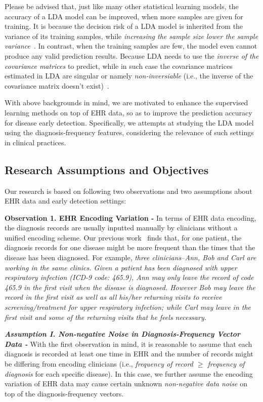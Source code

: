 \documentclass[journal,compsoc]{IEEEtran}
\begin{document}
Please be advised that, just like many other statistical learning models, the accuracy of a LDA model can be improved, when more samples are given for training.
It is because the decision risk of a LDA model is inherited from the variance of its training samples, while \emph{increasing the sample size lower the sample variance}~\cite{hsu1947complete,qiao2008effective}.
In contrast, when the training samples are few, the model even cannot produce any valid prediction results.
Because LDA needs to use the \emph{inverse of the covariance matrices} to predict, while in such case the covariance matrices estimated in LDA are singular or namely \emph{non-inversiable} (i.e., the inverse of the covariance matrix doesn't exist)~\cite{huang2002solving,gao2006direct}.


With above backgrounds in mind, we are motivated to enhance the supervised learning methods on top of EHR data, so as to improve the prediction accuracy for disease early detection.
Specifically, we attempts at studying the LDA model using the diagnosis-frequency features, considering the relevance of such settings in clinical practices.


\subsection{Research Assumptions and Objectives}

Our research is based on following two  observations and two assumptions about EHR data and early detection settings:

\textbf{Observation 1. EHR Encoding Variation - } 
In terms of EHR data encoding, the diagnosis records are usually inputted manually by clinicians without a unified encoding scheme.
Our previous work~\cite{xxx} finds that, for one patient, the diagnosis records for one disease might be more frequent than the times that the disease has been diagnosed.
For example, \emph{three clinicians--Ann, Bob and Carl are working in the same clinics.
Given a patient has been diagnosed with upper respiratory infection (ICD-9 code: 465.9), Ann may only leave the record  of code 465.9 in the first visit when the disease is diagnosed.
However Bob may leave the record in the first visit as well as all his/her returning visits to receive screening/treatment for upper respiratory infection; while Carl may leave in the first visit and some of the returning visits that he feels necessary.}  

\textbf{\em Assumption I. Non-negative Noise in Diagnosis-Frequency Vector Data - } 
With the first observation in mind, it is reasonable to assume that each diagnosis is recorded at least one time in EHR and the number of records might be differing from encoding clinicians (i.e., \emph{frequency of record $\geq$ frequency of diagnosis} for each specific disease).
In this case, we further assume the encoding variation of EHR data may cause certain unknown \emph{non-negative data noise} on top of the diagnosis-frequency vectors.
\end{document}
